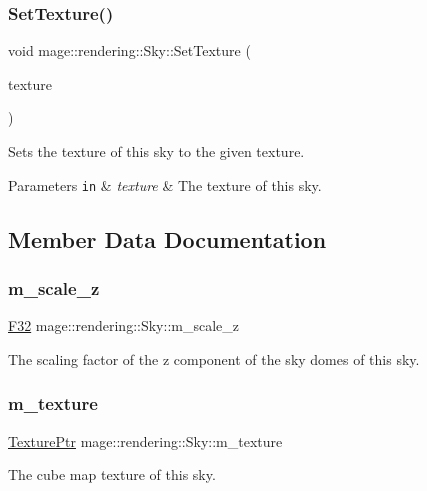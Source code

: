 \subsubsection{\texorpdfstring{Set\+Texture()}{SetTexture()}}
{\footnotesize\ttfamily void mage\+::rendering\+::\+Sky\+::\+Set\+Texture (\begin{DoxyParamCaption}\item[{\mbox{\hyperlink{namespacemage_1_1rendering_a6f3ae54f825328465b0cdde0f0de4a36}{Texture\+Ptr}}}]{texture }\end{DoxyParamCaption})}

Sets the texture of this sky to the given texture.


\begin{DoxyParams}[1]{Parameters}
\mbox{\tt in}  & {\em texture} & The texture of this sky. \\
\hline
\end{DoxyParams}


\subsection{Member Data Documentation}
\mbox{\label{classmage_1_1rendering_1_1_sky_a45ba48d9ce09ff566f9edb930d759dba}} 
\subsubsection{\texorpdfstring{m\+\_\+scale\+\_\+z}{m\_scale\_z}}
{\footnotesize\ttfamily \mbox{\hyperlink{namespacemage_aa97e833b45f06d60a0a9c4fc22ae02c0}{F32}} mage\+::rendering\+::\+Sky\+::m\+\_\+scale\+\_\+z\hspace{0.3cm}{\ttfamily [private]}}

The scaling factor of the z component of the sky domes of this sky. \mbox{\label{classmage_1_1rendering_1_1_sky_a674493833d7c13a329ba35429a1d9dfa}} 
\subsubsection{\texorpdfstring{m\+\_\+texture}{m\_texture}}
{\footnotesize\ttfamily \mbox{\hyperlink{namespacemage_1_1rendering_a6f3ae54f825328465b0cdde0f0de4a36}{Texture\+Ptr}} mage\+::rendering\+::\+Sky\+::m\+\_\+texture\hspace{0.3cm}{\ttfamily [private]}}

The cube map texture of this sky. 